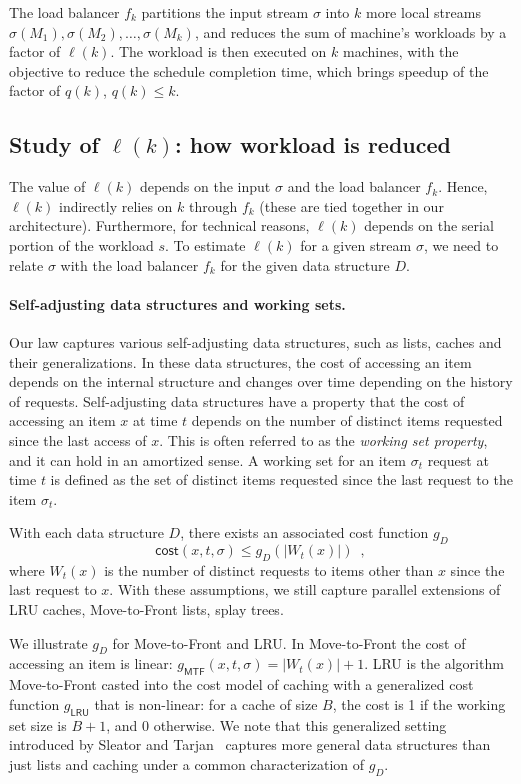 The load balancer $f_k$ partitions the input stream $\sigma$ into $k$ more local streams $\sigma(M_1), \sigma(M_2), \ldots, \sigma(M_k)$, and reduces the sum of machine's workloads by a factor of $\ell(k)$. The workload is then executed on $k$ machines, with the objective to reduce the schedule completion time, which brings speedup of the factor of $q(k)$, $q(k)\le k$.


\subsection{Study of $\ell(k)$: how workload is reduced}

The value of $\ell(k)$ depends on the input $\sigma$ and the load balancer $f_k$. Hence, $\ell(k)$ indirectly relies on $k$ through $f_k$ (these are tied together in our architecture). Furthermore, for technical reasons, $\ell(k)$ depends on the serial portion of the workload $s$.
To estimate $\ell(k)$ for a given stream $\sigma$, we need to relate  $\sigma$ with the load balancer $f_k$ for the given data structure $D$.



\paragraph*{Self-adjusting data structures and working sets.}
Our law captures various self-adjusting data structures, such as lists, caches and their generalizations.
In these data structures, the cost of accessing an item depends on the internal structure and changes over time depending on the history of requests.
Self-adjusting data structures have a property that the cost of accessing an item $x$ at time $t$ depends on the number of distinct items requested since the last access of $x$.
This is often referred to as the \emph{working set property}, and it can hold in an amortized sense.
A working set for an item $\sigma_t$ request at time $t$ is defined as the set of distinct items requested since the last request to the item $\sigma_t$.

With each data structure $D$, there exists an associated cost function $g_D$ 
\[
	\textsf{cost}(x, t, \sigma) \le g_D(|W_t(x)|) \enspace ,
\]
where $W_t(x)$ is the number of distinct requests to items other than $x$ since the last request to $x$.
With these assumptions, we still capture parallel extensions of LRU caches, Move-to-Front lists, splay trees. 


We illustrate $g_D$ for Move-to-Front and LRU. In Move-to-Front the cost of accessing an item is linear: $g_\textsf{MTF}(x,t,\sigma) = |W_t(x)| + 1$.  LRU is the algorithm Move-to-Front casted into the cost model of caching with a generalized cost function $g_\textsf{LRU}$ that is non-linear: for a cache of size $B$, the cost is 1 if the working set size is $B+1$, and 0 otherwise.
We note that this generalized setting introduced by Sleator and Tarjan~\cite{SleatorT85} captures more general data structures than just lists and caching under a common characterization of $g_D$.




